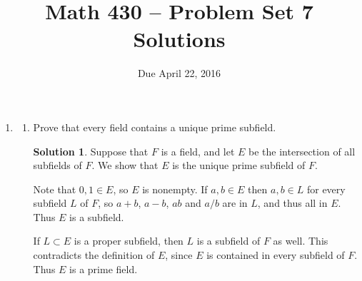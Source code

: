 \documentclass{article}
\title{Math 430 -- Problem Set 7 Solutions}
\date{Due April 22, 2016}
\theoremstyle{definition}
\newtheorem*{solution}{Solution}
\begin{document}
\maketitle


\begin{enumerate}
\item[18.10.] 
\begin{enumerate}
\item Prove that every field contains a unique prime subfield.
\begin{solution} 
Suppose that $F$ is a field, and let $E$ be the intersection of all subfields of $F$.  We show that $E$ is the unique prime subfield of $F$.

Note that $0, 1 \in E$, so $E$ is nonempty.  If $a, b \in E$ then $a, b \in L$ for every subfield $L$ of $F$, so $a+b$, $a-b$, $ab$ and $a/b$ are in $L$, and thus all in $E$.  Thus $E$ is a subfield.

If $L \subset E$ is a proper subfield, then $L$ is a subfield of $F$ as well.  This contradicts the definition of $E$, since $E$ is contained in every subfield of $F$.  Thus $E$ is a prime field.


\end{solution}
\end{enumerate}
\end{enumerate}
\end{document}
